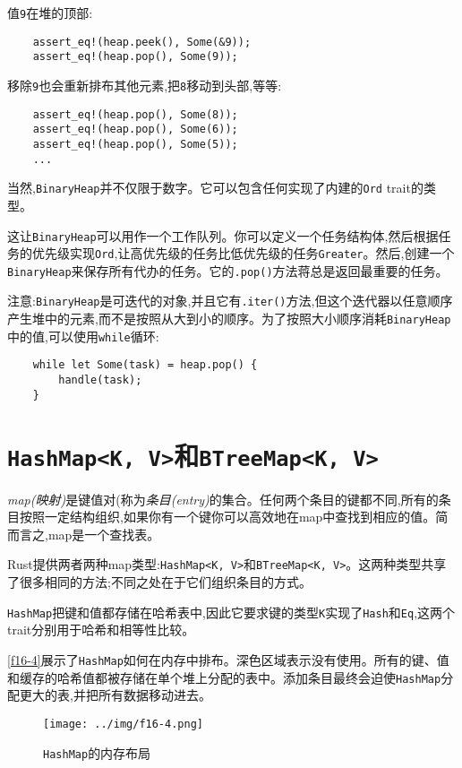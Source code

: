 值\texttt{9}在堆的顶部:
\begin{verbatim}
    assert_eq!(heap.peek(), Some(&9));
    assert_eq!(heap.pop(), Some(9));
\end{verbatim}

移除\texttt{9}也会重新排布其他元素,把\texttt{8}移动到头部,等等:
\begin{verbatim}
    assert_eq!(heap.pop(), Some(8));
    assert_eq!(heap.pop(), Some(6));
    assert_eq!(heap.pop(), Some(5));
    ...
\end{verbatim}

当然,\texttt{BinaryHeap}并不仅限于数字。它可以包含任何实现了内建的\texttt{Ord} trait的类型。

这让\texttt{BinaryHeap}可以用作一个工作队列。你可以定义一个任务结构体,然后根据任务的优先级实现\texttt{Ord},让高优先级的任务比低优先级的任务\texttt{Greater}。然后,创建一个\texttt{BinaryHeap}来保存所有代办的任务。它的\texttt{.pop()}方法蒋总是返回最重要的任务。

注意:\texttt{BinaryHeap}是可迭代的对象,并且它有\texttt{.iter()}方法,但这个迭代器以任意顺序产生堆中的元素,而不是按照从大到小的顺序。为了按照大小顺序消耗\texttt{BinaryHeap}中的值,可以使用\texttt{while}循环:
\begin{verbatim}
    while let Some(task) = heap.pop() {
        handle(task);
    }
\end{verbatim}

\section{\texttt{HashMap<K, V>}和\texttt{BTreeMap<K, V>}}

\emph{map(映射)}是键值对(称为\emph{条目(entry)}的集合。任何两个条目的键都不同,所有的条目按照一定结构组织,如果你有一个键你可以高效地在map中查找到相应的值。简而言之,map是一个查找表。

Rust提供两者两种map类型:\texttt{HashMap<K, V>}和\texttt{BTreeMap<K, V>}。这两种类型共享了很多相同的方法;不同之处在于它们组织条目的方式。

\texttt{HashMap}把键和值都存储在哈希表中,因此它要求键的类型\texttt{K}实现了\texttt{Hash}和\texttt{Eq},这两个trait分别用于哈希和相等性比较。

\autoref{f16-4}展示了\texttt{HashMap}如何在内存中排布。深色区域表示没有使用。所有的键、值和缓存的哈希值都被存储在单个堆上分配的表中。添加条目最终会迫使\texttt{HashMap}分配更大的表,并把所有数据移动进去。

\begin{figure}[htbp]
    \centering
    \texttt{[image: ../img/f16-4.png]}
    \caption{\texttt{HashMap}的内存布局}
    \label{f16-4}
\end{figure}

